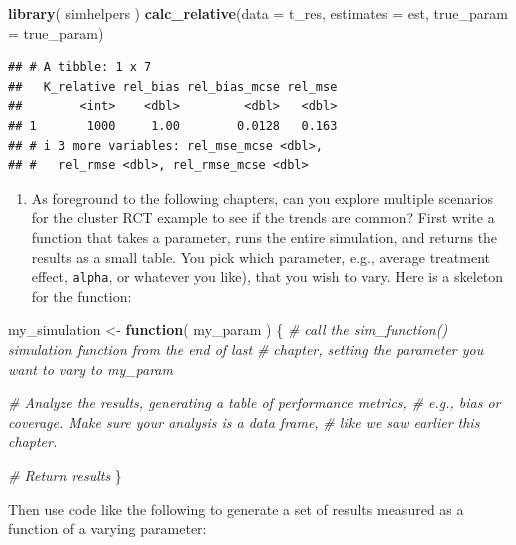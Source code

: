 \documentclass[
]{book}
\newenvironment{Shaded}{\begin{snugshade}}{\end{snugshade}}
\newcommand{\AttributeTok}[1]{\textcolor[rgb]{0.13,0.29,0.53}{#1}}
\newcommand{\CommentTok}[1]{\textcolor[rgb]{0.56,0.35,0.01}{\textit{#1}}}
\newcommand{\ControlFlowTok}[1]{\textcolor[rgb]{0.13,0.29,0.53}{\textbf{#1}}}
\newcommand{\FunctionTok}[1]{\textcolor[rgb]{0.13,0.29,0.53}{\textbf{#1}}}
\newcommand{\NormalTok}[1]{#1}
\newcommand{\OtherTok}[1]{\textcolor[rgb]{0.56,0.35,0.01}{#1}}
\providecommand{\tightlist}{%
  \setlength{\itemsep}{0pt}\setlength{\parskip}{0pt}}
\begin{document}
\begin{Shaded}
\begin{Highlighting}[]
\FunctionTok{library}\NormalTok{( simhelpers )}
\FunctionTok{calc\_relative}\NormalTok{(}\AttributeTok{data =}\NormalTok{ t\_res, }\AttributeTok{estimates =}\NormalTok{ est, }\AttributeTok{true\_param =}\NormalTok{ true\_param)}
\end{Highlighting}
\end{Shaded}

\begin{verbatim}
## # A tibble: 1 x 7
##   K_relative rel_bias rel_bias_mcse rel_mse
##        <int>    <dbl>         <dbl>   <dbl>
## 1       1000     1.00        0.0128   0.163
## # i 3 more variables: rel_mse_mcse <dbl>,
## #   rel_rmse <dbl>, rel_rmse_mcse <dbl>
\end{verbatim}

\begin{enumerate}
\def\labelenumi{\arabic{enumi}.}
\setcounter{enumi}{2}
\tightlist
\item
  As foreground to the following chapters, can you explore multiple scenarios for the cluster RCT example to see if the trends are common? First write a function that takes a parameter, runs the entire simulation, and returns the results as a small table. You pick which parameter, e.g., average treatment effect, \texttt{alpha}, or whatever you like), that you wish to vary. Here is a skeleton for the function:
\end{enumerate}

\begin{Shaded}
\begin{Highlighting}[]
\NormalTok{my\_simulation }\OtherTok{\textless{}{-}} \ControlFlowTok{function}\NormalTok{( my\_param ) \{}
  \CommentTok{\# call the sim\_function() simulation function from the end of last}
  \CommentTok{\# chapter, setting the parameter you want to vary to my\_param}
  
  \CommentTok{\# Analyze the results, generating a table of performance metrics,}
  \CommentTok{\# e.g., bias or coverage. Make sure your analysis is a data frame,}
  \CommentTok{\# like we saw earlier this chapter.}
  
  \CommentTok{\# Return results}
\NormalTok{\}}
\end{Highlighting}
\end{Shaded}

Then use code like the following to generate a set of results measured as a function of a varying parameter:
\end{document}

